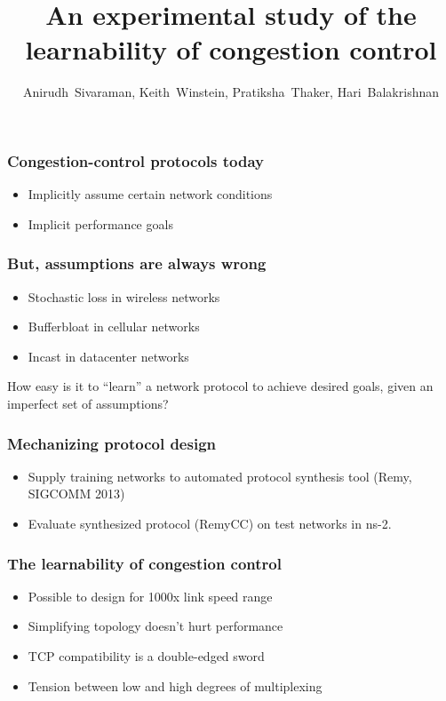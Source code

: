 \documentclass[svgnames]{beamer}
\title{An experimental study of the learnability of congestion control}
\author{Anirudh~Sivaraman, Keith~Winstein, Pratiksha~Thaker, Hari~Balakrishnan}
\institute{MIT CSAIL\vspace{\baselineskip}}
\begin{document}
\begin{frame}

\titlepage

\end{frame}

\begin{Large}
\begin{frame}
\frametitle{Congestion-control protocols today}
\begin{itemize}
\item<2-> Implicitly assume certain network conditions
\item<3-> Implicit performance goals
\end{itemize}
\end{frame}

\begin{frame}
\frametitle{But, assumptions are always wrong}
\begin{itemize}
\item<2-> Stochastic loss in wireless networks
\item<3-> Bufferbloat in cellular networks
\item<4-> Incast in datacenter networks
\end{itemize}
\end{frame}

\begin{frame}
\begin{center}
How easy is it to “learn” a network protocol to achieve desired goals, given
an imperfect set of assumptions?
\end{center}
\end{frame}

\begin{frame}
\frametitle{Mechanizing protocol design}
\begin{itemize}
\item <2->Supply training networks to automated protocol synthesis tool (Remy, SIGCOMM 2013) 
\item <3->Evaluate synthesized protocol (RemyCC) on test networks in ns-2.
\end{itemize}
\end{frame}







 



\begin{frame}
\frametitle{The learnability of congestion control}
\begin{itemize}
\item<2-> Possible to design for 1000x link speed range
\item<3-> Simplifying topology doesn't hurt performance
\item<4-> TCP compatibility is a double-edged sword 
\item<5-> Tension between low and high degrees of multiplexing
\end{itemize}
\end{frame}


\end{Large}
\end{document}
